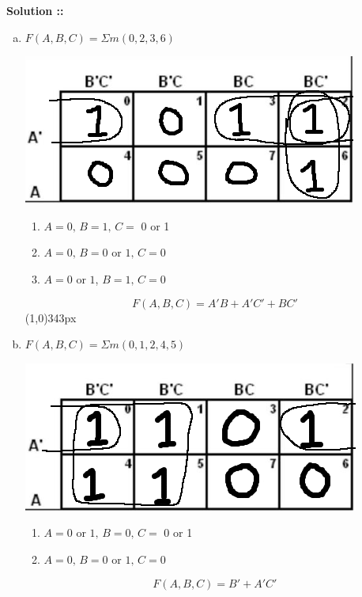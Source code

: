 \documentclass[11pt]{article}
\begin{document}
\vspace{5px}\textbf{Solution ::}
\begin{enumerate}[a)]
    \item
    $F(A, B, C) = \Sigma m(0, 2, 3, 6)$
    \vspace{-15pt}\begin{center}
        \includegraphics[scale=0.35]{1a.png}
    \end{center}
    \vspace{-20pt}\begin{enumerate}[$\bullet$]
        \item $A=0,\, B=1,\, C=$ 0 or 1
        \item \vspace{-5pt}$A=0,\,B = 0$ or $1,\, C=0$
        \item \vspace{-5pt}$A= 0$ or $1$, $B = 1,\,C=0$
    \end{enumerate}
    $$F(A,B,C) = A'B + A'C' + BC'$$
    \line(1,0){343px}

    \item
    $F(A, B, C) = \Sigma m(0, 1, 2, 4, 5)$
    \vspace{-15pt}\begin{center}
        \includegraphics[scale=0.35]{1b.png}
    \end{center}
    \vspace{-20pt}\begin{enumerate}[$\bullet$]
        \item $A=0$ or $1,\, B=0,\, C=$ 0 or 1
        \item \vspace{-5pt}$A=0,\,B = 0$ or $1,\, C=0$
    \end{enumerate}
    $$F(A,B,C) = B' + A'C'$$
    \pagebreak


\end{enumerate}
\end{document}
